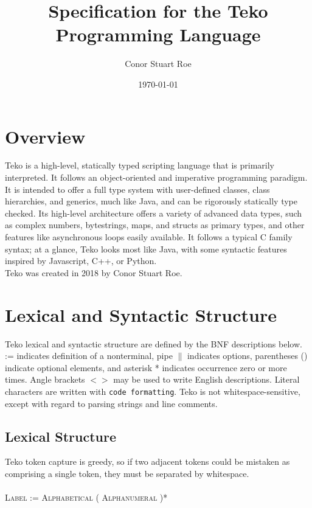 \documentclass{article}
\title{Specification for the Teko Programming Language}
\author{Conor Stuart Roe}
\date{\today}
\newcommand{\code}[1]{\colorbox{light-gray}{\texttt{#1}}}
\begin{document}
\thispagestyle{empty}
\maketitle

\section{Overview}

Teko is a high-level, statically typed scripting language that is primarily interpreted. It follows an object-oriented and imperative programming paradigm. It is intended to offer a full type system with user-defined classes, class hierarchies, and generics, much like Java, and can be rigorously statically type checked. Its high-level architecture offers a variety of advanced data types, such as complex numbers, bytestrings, maps, and structs as primary types, and other features like asynchronous loops easily available. It follows a typical C family syntax; at a glance, Teko looks most like Java, with some syntactic features inspired by Javascript, C++, or Python. \\

Teko was created in 2018 by Conor Stuart Roe.

\section{Lexical and Syntactic Structure}

Teko lexical and syntactic structure are defined by the BNF descriptions below. := indicates definition of a nonterminal, pipe $\|$ indicates options, parentheses () indicate optional elements, and asterisk * indicates occurrence zero or more times. Angle brackets $<>$ may be used to write English descriptions. Literal characters are written with \code{code formatting}. Teko is not whitespace-sensitive, except with regard to parsing strings and line comments.

\subsection{Lexical Structure}

Teko token capture is greedy, so if two adjacent tokens could be mistaken as comprising a single token, they must be separated by whitespace. \\ \\

\textsc{Label} := \textsc{Alphabetical} ( \textsc{Alphanumeral} )* 
\end{document}
